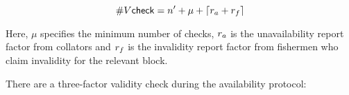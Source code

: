 $$\#V\mathsf{check} = n' + \mu +\lceil r_{a} + r_{f} \rceil$$

Here, $\mu$ specifies the minimum number of checks, $r_{a}$ is the unavailability report factor from collators and $r_{f}$ is the invalidity report factor from fishermen who claim invalidity for the relevant block. 






There are a three-factor validity check during the availability protocol:


